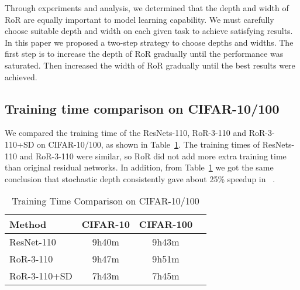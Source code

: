\documentclass[journal]{IEEEtran}
\begin{document}
\par 
Through experiments and analysis, we determined that the depth and width of RoR are equally important to model learning capability. We must carefully choose suitable depth and width on each given task to achieve satisfying results. In this paper we proposed a two-step strategy to choose depths and widths. The first step is to increase the depth of RoR gradually until the performance was saturated. Then increased the width of RoR gradually until the best results were achieved. 
\subsection{Training time comparison on CIFAR-10/100}
We compared the training time of the ResNets-110, RoR-3-110 and RoR-3-110+SD on CIFAR-10/100, as shown in Table~\ref{tab:time}. The training times of ResNets-110 and RoR-3-110 were similar, so RoR did not add more extra training time than original residual networks. In addition, from Table~\ref{tab:time} we got the same conclusion that stochastic depth consistently gave about 25\% speedup in ~\cite{huang2016SD}.
\begin{table}[!t]
\renewcommand{\arraystretch}{1.3}
\caption{Training Time Comparison on CIFAR-10/100}
\label{tab:time}
\centering
\begin{tabular}{|l|c|c|c|}
\hline
Method              &CIFAR-10            &CIFAR-100       \\ \hline\hline
ResNet-110          &9h40m                &9h43m                      \\\hline
RoR-3-110           &9h47m                &9h51m                        \\\hline
RoR-3-110+SD                   &7h43m                &7h45m                \\\hline
\end{tabular}
\end{table}
\end{document}
